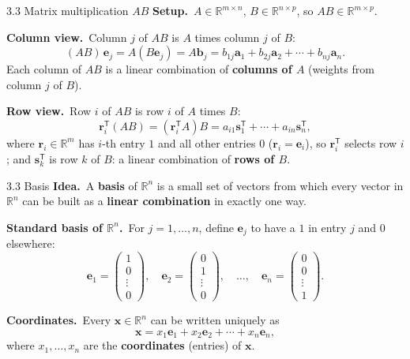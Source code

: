 \documentclass[11pt,aspectratio=169]{beamer}
\begin{document}
\begin{frame}{3.3 Matrix multiplication $AB$}
  \footnotesize
  \textbf{Setup.}\
  $A\in\mathbb{R}^{m\times n}$, $B\in\mathbb{R}^{n\times p}$, so $AB\in\mathbb{R}^{m\times p}$.

  \medskip
  \textbf{Column view.}\
  Column $j$ of $AB$ is $A$ times column $j$ of $B$:
  \[
    (AB)\,\mathbf{e}_j = A(B\mathbf{e}_j)
    = A\mathbf{b}_j
    = b_{1j}\mathbf{a}_1+b_{2j}\mathbf{a}_2+\cdots+b_{nj}\mathbf{a}_n.
  \]
  Each column of $AB$ is a linear combination of \textbf{columns of $A$} (weights from column $j$ of
  $B$).

  \medskip
  \textbf{Row view.}\
  Row $i$ of $AB$ is row $i$ of $A$ times $B$:
  \[
    \mathbf{r}_i^{\mathsf T}(AB)
    = (\mathbf{r}_i^{\mathsf T}A)B
    = a_{i1}\mathbf{s}_1^{\mathsf T}+\cdots+a_{in}\mathbf{s}_n^{\mathsf T},
  \]
  where $\mathbf{r}_i\in\mathbb{R}^m$ has $i$-th entry $1$ and all other entries $0$
  ($\mathbf{r}_i=\mathbf{e}_i$), so $\mathbf{r}_i^{\mathsf T}$ selects row $i$; and
  $\mathbf{s}_k^{\mathsf T}$ is row $k$ of $B$: a linear combination of \textbf{rows of $B$}.
\end{frame}

\begin{frame}{3.3 Basis}
  \footnotesize
  \textbf{Idea.}\
  A \textbf{basis} of $\mathbb{R}^n$ is a small set of vectors from which every vector in
  $\mathbb{R}^n$ can be built as a \textbf{linear combination} in exactly one way.

  \medskip
  \textbf{Standard basis of $\mathbb{R}^n$.}\
  For $j=1,\ldots,n$, define $\mathbf{e}_j$ to have a $1$ in entry $j$ and $0$ elsewhere:
  \[
    \mathbf{e}_1=
    \begin{pmatrix}1\\ 0\\ \vdots\\ 0\end{pmatrix},
    \quad
    \mathbf{e}_2=
    \begin{pmatrix}0\\ 1\\ \vdots\\ 0\end{pmatrix},
    \quad\ldots,\quad
    \mathbf{e}_n=
    \begin{pmatrix}0\\ 0\\ \vdots\\ 1\end{pmatrix}.
  \]

  \medskip
  \textbf{Coordinates.}\
  Every $\mathbf{x}\in\mathbb{R}^n$ can be written uniquely as
  \[
    \mathbf{x}=x_1\mathbf{e}_1+x_2\mathbf{e}_2+\cdots+x_n\mathbf{e}_n,
  \]
  where $x_1,\ldots,x_n$ are the \textbf{coordinates} (entries) of $\mathbf{x}$.
\end{frame}
\end{document}
